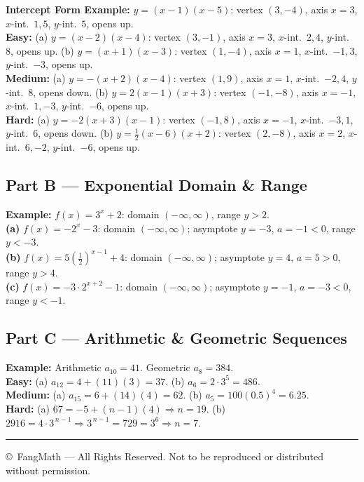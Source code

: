 \documentclass[11pt]{article}
\begin{document}
{\textbf{Intercept Form Example:} $y=(x-1)(x-5)$: vertex $(3,-4)$, axis $x=3$, $x$-int.\ $1,5$, $y$-int.\ $5$, opens up.\\[1mm]
\textbf{Easy:} (a) $y=(x-2)(x-4)$: vertex $(3,-1)$, axis $x=3$, $x$-int.\ $2,4$, $y$-int.\ $8$, opens up.
\quad (b) $y=(x+1)(x-3)$: vertex $(1,-4)$, axis $x=1$, $x$-int.\ $-1,3$, $y$-int.\ $-3$, opens up.\\[1mm]
\textbf{Medium:} (a) $y=-(x+2)(x-4)$: vertex $(1,9)$, axis $x=1$, $x$-int.\ $-2,4$, $y$-int.\ $8$, opens down.
\quad (b) $y=2(x-1)(x+3)$: vertex $(-1,-8)$, axis $x=-1$, $x$-int.\ $1,-3$, $y$-int.\ $-6$, opens up.\\[1mm]
\textbf{Hard:} (a) $y=-2(x+3)(x-1)$: vertex $(-1,8)$, axis $x=-1$, $x$-int.\ $-3,1$, $y$-int.\ $6$, opens down.
\quad (b) $y=\tfrac12(x-6)(x+2)$: vertex $(2,-8)$, axis $x=2$, $x$-int.\ $6,-2$, $y$-int.\ $-6$, opens up.
}

\subsection*{Part B --- Exponential Domain \& Range}
{\small
\textbf{Example:} $f(x)=3^x+2$: domain $(-\infty,\infty)$, range $y>2$.\\[1mm]
\textbf{(a)} $f(x)=-2^x-3$: domain $(-\infty,\infty)$; asymptote $y=-3$, $a=-1<0$, range $y<-3$.\\
\textbf{(b)} $f(x)=5(\tfrac12)^{x-1}+4$: domain $(-\infty,\infty)$; asymptote $y=4$, $a=5>0$, range $y>4$.\\
\textbf{(c)} $f(x)=-3\cdot2^{x+2}-1$: domain $(-\infty,\infty)$; asymptote $y=-1$, $a=-3<0$, range $y<-1$.
}

\subsection*{Part C --- Arithmetic \& Geometric Sequences}
{\small
\textbf{Example:} Arithmetic $a_{10}=41$. \quad Geometric $a_8=384$.\\[1mm]
\textbf{Easy:} (a) $a_{12}=4+(11)(3)=37$. \quad (b) $a_6=2\cdot3^5=486$.\\
\textbf{Medium:} (a) $a_{15}=6+(14)(4)=62$. \quad (b) $a_5=100(0.5)^4=6.25$.\\
\textbf{Hard:} (a) $67=-5+(n-1)(4) \Rightarrow n=19$. \quad (b) $2916=4\cdot3^{\,n-1} \Rightarrow 3^{\,n-1}=729=3^6 \Rightarrow n=7$.
}

\vspace{4mm}
\hrule
\vspace{2mm}
\begin{center}
{\small \copyright\ FangMath --- All Rights Reserved. Not to be reproduced or distributed without permission.}
\end{center}
\end{document}
